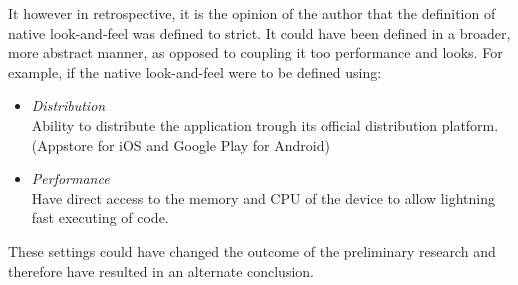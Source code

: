It however in retrospective, it is the opinion of the author that the definition of native look-and-feel was defined to strict. It could have been defined in a broader, more abstract manner, as opposed to coupling it too performance and looks. For example, if the native look-and-feel were to be defined using: 
\begin{itemize}
\item \emph{Distribution}\\
Ability to distribute the application trough its official distribution platform. (Appstore for iOS and Google Play for Android)
\item \emph{Performance}\\
Have direct access to the memory and CPU of the device to allow lightning fast executing of code.
\end{itemize}
\noindent These settings could have changed the outcome of the preliminary research and therefore have resulted in an alternate conclusion.